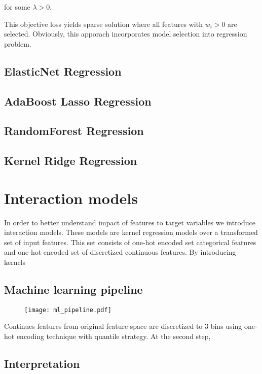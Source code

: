 \documentclass{article}
\begin{document}
for some $\lambda>0$.


This objective loss yields sparse solution where all features with $w_i>0$ are selected. Obviously, this apporach incorporates model selection into regression problem.

\subsection{ElasticNet Regression}

\subsection{AdaBoost Lasso Regression}

\subsection{RandomForest Regression}

\subsection{Kernel Ridge Regression}



\section{Interaction models}
In order to better understand impact of features to target variables we introduce interaction models. These models are kernel regression models over a transformed set of input features. This set consists of one-hot encoded set categorical features and one-hot encoded set of discretized continuous features. By introducing kernels  
\subsection{Machine learning pipeline}

\begin{figure}
  \texttt{[image: ml\_pipeline.pdf]}
\end{figure}

Continues features from original feature space are discretized to $3$ bins using one-hot encoding technique with quantile strategy. At the second step,  

\subsection{Interpretation}
\end{document}

